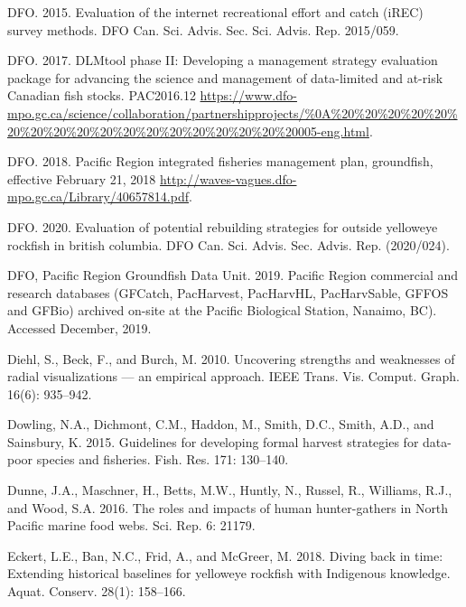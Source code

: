 \documentclass[11pt]{book}
\begin{document}
\leavevmode\hypertarget{ref-dfo2015}{}%
DFO. 2015. Evaluation of the internet recreational effort and catch (iREC) survey methods. DFO Can. Sci. Advis. Sec. Sci. Advis. Rep. 2015/059.

\leavevmode\hypertarget{ref-dfo_dlmtool_2017}{}%
DFO. 2017. DLMtool phase II: Developing a management strategy evaluation package for advancing the science and management of data-limited and at-risk Canadian fish stocks. PAC2016.12 \url{https://www.dfo-mpo.gc.ca/science/collaboration/partnershipprojects/\%0A\%20\%20\%20\%20\%20\%20\%20\%20\%20\%20\%20\%20\%20\%20\%20\%20\%20\%20005-eng.html}.

\leavevmode\hypertarget{ref-ifmp2018}{}%
DFO. 2018. Pacific Region integrated fisheries management plan, groundfish, effective February 21, 2018 \url{http://waves-vagues.dfo-mpo.gc.ca/Library/40657814.pdf}.

\leavevmode\hypertarget{ref-dfo2020}{}%
DFO. 2020. Evaluation of potential rebuilding strategies for outside yelloweye rockfish in british columbia. DFO Can. Sci. Advis. Sec. Advis. Rep. (2020/024).

\leavevmode\hypertarget{ref-databases2019}{}%
DFO, Pacific Region Groundfish Data Unit. 2019. Pacific Region commercial and research databases (GFCatch, PacHarvest, PacHarvHL, PacHarvSable, GFFOS and GFBio) archived on-site at the Pacific Biological Station, Nanaimo, BC). Accessed December, 2019.

\leavevmode\hypertarget{ref-diehl2010}{}%
Diehl, S., Beck, F., and Burch, M. 2010. Uncovering strengths and weaknesses of radial visualizations --- an empirical approach. IEEE Trans. Vis. Comput. Graph. 16(6): 935--942.

\leavevmode\hypertarget{ref-dowling2015a}{}%
Dowling, N.A., Dichmont, C.M., Haddon, M., Smith, D.C., Smith, A.D., and Sainsbury, K. 2015. Guidelines for developing formal harvest strategies for data-poor species and fisheries. Fish. Res. 171: 130--140.

\leavevmode\hypertarget{ref-dunne2016}{}%
Dunne, J.A., Maschner, H., Betts, M.W., Huntly, N., Russel, R., Williams, R.J., and Wood, S.A. 2016. The roles and impacts of human hunter-gathers in North Pacific marine food webs. Sci. Rep. 6: 21179.

\leavevmode\hypertarget{ref-eckert2018}{}%
Eckert, L.E., Ban, N.C., Frid, A., and McGreer, M. 2018. Diving back in time: Extending historical baselines for yelloweye rockfish with Indigenous knowledge. Aquat. Conserv. 28(1): 158--166.
\end{document}
